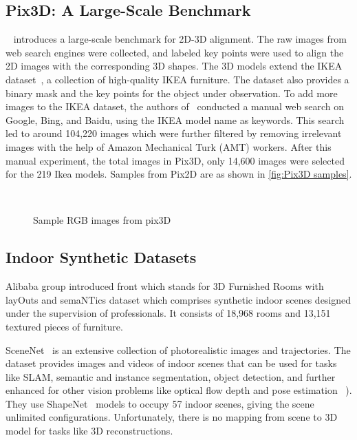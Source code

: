 \subsection{Pix3D: A Large-Scale Benchmark}\label{sec:pix3d}
~\cite{Sun2018} introduces a large-scale benchmark for 2D-3D alignment.
The raw images from web search engines were collected, and labeled key points were used to align the 2D images with the corresponding 3D shapes.
The 3D models extend the IKEA dataset~\cite{Lim2013}, a collection of high-quality IKEA furniture.
The dataset also provides a binary mask and the key points for the object under observation.
To add more images to the IKEA dataset, the authors of~\cite{Sun2018} conducted a manual web search on Google, Bing, and Baidu, using the IKEA model name as keywords.
This search led to around 104,220 images which were further filtered by removing irrelevant images with the help of Amazon Mechanical Turk (AMT) workers.
After this manual experiment, the total images in Pix3D, only 14,600 images were selected for the 219 Ikea models.
Samples from Pix2D are as shown in \autoref{fig:Pix3D samples}.

\begin{figure}[!ht]
    \centering
    \quad
    \\
    \quad
    \caption[Samples from Pix3D.]{Sample RGB images from pix3D}
    \label{fig:Pix3D samples}
\end{figure}

\subsection{Indoor Synthetic Datasets}\label{subsec:indoor-synthetic-datasets}
Alibaba group introduced \gls{front} \cite{Fu20203DFRONT3F} which stands for 3D Furnished Rooms with layOuts and semaNTics dataset which comprises
synthetic indoor scenes designed under the supervision of professionals.
It consists of 18,968 rooms and 13,151 textured pieces of furniture.

SceneNet~\cite{McCormac2017} is an extensive collection of photorealistic images and trajectories.
The dataset provides images and videos of indoor scenes that can be used for tasks like SLAM,
semantic and instance segmentation, object detection, and further enhanced for other vision problems like optical flow depth and pose estimation ~\cite{McCormac2017}).
They use ShapeNet~\cite{shapenet2015} models to occupy 57 indoor scenes, giving the scene unlimited configurations.
Unfortunately, there is no mapping from scene to 3D model for tasks like 3D reconstructions.

